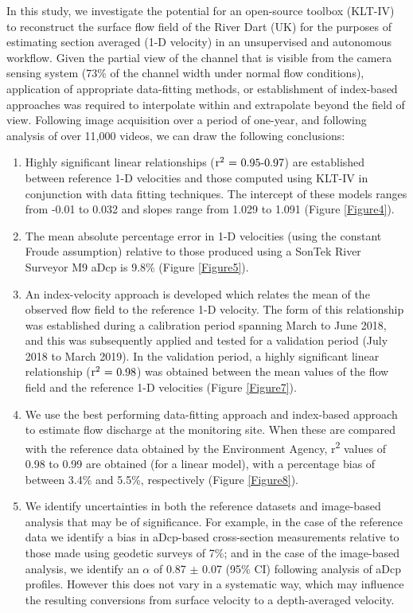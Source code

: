 \documentclass[hess, manuscript]{copernicus} %
\begin{document}
\conclusions  %
In this study, we investigate the potential for an open-source toolbox (KLT-IV) to reconstruct the surface flow field of the River Dart (UK) for the purposes of estimating section averaged (1-D velocity) in an unsupervised and autonomous workflow. Given the partial view of the channel that is visible from the camera sensing system (73\% of the channel width under normal flow conditions), application of appropriate data-fitting methods, or establishment of index-based approaches was required to interpolate within and extrapolate beyond the field of view. Following image acquisition over a period of one-year, and following analysis of over 11,000 videos, we can draw the following conclusions:

\begin{enumerate}
    \item Highly significant linear relationships (${\textnormal{r\textsuperscript{2} = 0.95-0.97}}$) are established between reference 1-D velocities and those computed using KLT-IV in conjunction with data fitting techniques. The intercept of these models ranges from -0.01 to 0.032 and slopes range from 1.029 to 1.091 (Figure \ref{Figure4}). 
    \item The mean absolute percentage error in 1-D velocities (using the constant Froude assumption) relative to those produced using a SonTek River Surveyor M9 aDcp is 9.8\% (Figure \ref{Figure5}).    
    \item An index-velocity approach is developed which relates the mean of the observed flow field to the reference 1-D velocity. The form of this relationship was established during a calibration period spanning March to June 2018, and this was subsequently applied and tested for a validation period (July 2018 to March 2019). In the validation period, a highly significant linear relationship (${\textnormal{r\textsuperscript{2} = 0.98}}$) was obtained between the mean values of the flow field and the reference 1-D velocities (Figure \ref{Figure7}).
    \item We use the best performing data-fitting approach and index-based approach to estimate flow discharge at the monitoring site. When these are compared with the reference data obtained by the Environment Agency, r\textsuperscript{2} values of 0.98 to 0.99 are obtained (for a linear model), with a percentage bias of between 3.4\% and 5.5\%, respectively (Figure \ref{Figure8}).
    \item We identify uncertainties in both the reference datasets and image-based analysis that may be of significance. For example, in the case of the reference data we identify a bias in aDcp-based cross-section measurements relative to those made using geodetic surveys of 7\%; and in the case of the image-based analysis, we identify an $\alpha$ of 0.87 $\pm$ 0.07 (95\% CI) following analysis of aDcp profiles. However this does not vary in a systematic way, which may influence the resulting conversions from surface velocity to a depth-averaged velocity. 

\end{enumerate}
\end{document}
